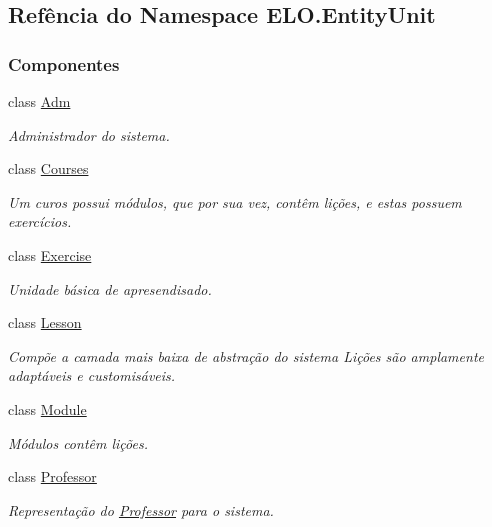 \hypertarget{namespaceELO_1_1EntityUnit}{}\subsection{Refência do Namespace E\+L\+O.\+Entity\+Unit}
\label{namespaceELO_1_1EntityUnit}
\subsubsection*{Componentes}
\begin{DoxyCompactItemize}
\item 
class \hyperlink{classELO_1_1EntityUnit_1_1Adm}{Adm}
\begin{DoxyCompactList}\small\item\em Administrador do sistema. \end{DoxyCompactList}\item 
class \hyperlink{classELO_1_1EntityUnit_1_1Courses}{Courses}
\begin{DoxyCompactList}\small\item\em Um curos possui módulos, que por sua vez, contêm lições, e estas possuem exercícios. \end{DoxyCompactList}\item 
class \hyperlink{classELO_1_1EntityUnit_1_1Exercise}{Exercise}
\begin{DoxyCompactList}\small\item\em Unidade básica de apresendisado. \end{DoxyCompactList}\item 
class \hyperlink{classELO_1_1EntityUnit_1_1Lesson}{Lesson}
\begin{DoxyCompactList}\small\item\em Compõe a camada mais baixa de abstração do sistema Lições são amplamente adaptáveis e customisáveis. \end{DoxyCompactList}\item 
class \hyperlink{classELO_1_1EntityUnit_1_1Module}{Module}
\begin{DoxyCompactList}\small\item\em Módulos contêm lições. \end{DoxyCompactList}\item 
class \hyperlink{classELO_1_1EntityUnit_1_1Professor}{Professor}
\begin{DoxyCompactList}\small\item\em Representação do \hyperlink{classELO_1_1EntityUnit_1_1Professor}{Professor} para o sistema. \end{DoxyCompactList}\item 

\end{DoxyCompactItemize}
